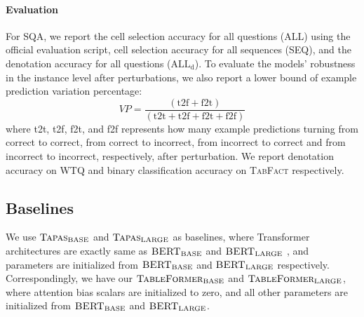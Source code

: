 \documentclass[11pt]{article}
\begin{document}
\paragraph{Evaluation}
For SQA, we report the cell selection accuracy for all questions (\textsc{ALL}) using the official evaluation script, cell selection accuracy for all sequences (\textsc{SEQ}), and the denotation accuracy for all questions ($\text{ALL}_{\text{d}}$). To evaluate the models' robustness in the instance level after perturbations, we also report a lower bound of example prediction variation percentage: 
\begin{equation}
VP= \frac{(\text{t2f} + \text{f2t})}{(\text{t2t}+\text{t2f}+\text{f2t}+\text{f2f})}    
\end{equation}
where t2t, t2f, f2t, and f2f represents how many example predictions turning from correct to correct, from correct to incorrect, from incorrect to correct and from incorrect to incorrect, respectively, after perturbation.
We report denotation accuracy on \textsc{WTQ} and binary classification accuracy on \textsc{TabFact} respectively.
 
\subsection{Baselines} We use $\textsc{Tapas}_{\text{BASE}}$ and $\textsc{Tapas}_{\text{LARGE}}$ as baselines, where Transformer architectures are exactly same as $\textsc{BERT}_{\text{BASE}}$ and $\textsc{BERT}_{\text{LARGE}}$ \cite{devlin2018bert}, and parameters are initialized from $\textsc{BERT}_{\text{BASE}}$ and $\textsc{BERT}_{\text{LARGE}}$ respectively. Correspondingly, we have our $\textsc{TableFormer}_{\text{BASE}}$ and $\textsc{TableFormer}_{\text{LARGE}}$, where attention bias scalars are initialized to zero, and all other parameters are initialized from $\textsc{BERT}_{\text{BASE}}$ and $\textsc{BERT}_{\text{LARGE}}$.  
\end{document}
